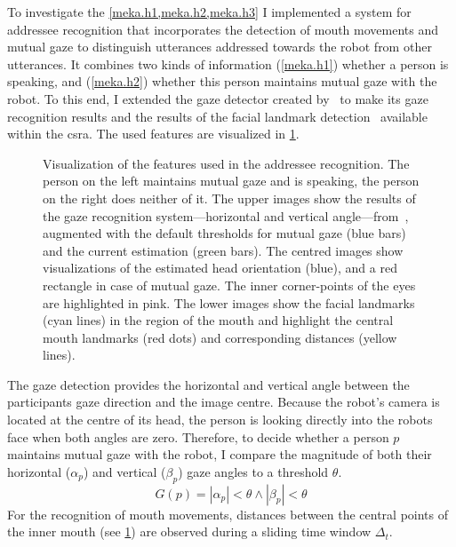 To investigate the \cref{meka.h1,meka.h2,meka.h3} I implemented a system for \gls{addressee} recognition that incorporates the detection of mouth movements and mutual gaze to distinguish utterances addressed towards the \gls{robot} from other utterances.
It combines two kinds of information (\cref{meka.h1}) whether a person is speaking, and (\cref{meka.h2}) whether this person maintains mutual gaze with the \gls{robot}.
To this end, I extended the gaze detector created by~ to make its gaze recognition results and the results of the facial landmark detection~\cite{Sagonas2013} available within the \gls{csra}.
The used features are visualized in \cref{fig:meka-features}.
\begin{figure}[htb]
    \centering
    \def\svgwidth{1.0\textwidth}
    
    \caption[Mutual gaze and mouth movement features.]{\label{fig:meka-features}
    Visualization of the features used in the \gls{addressee} recognition.
    The person on the left maintains mutual gaze and is speaking, the person on the right does neither of it.
    The upper images show the results of the gaze recognition system---horizontal and vertical angle---from~, augmented with the default thresholds for mutual gaze (blue bars) and the current estimation (green bars).
    The centred images show visualizations of the estimated head orientation (blue), and a red rectangle in case of mutual gaze.
    The inner corner-points of the eyes are highlighted in pink.
    The lower images show the facial landmarks (cyan lines) in the region of the mouth and highlight the central mouth landmarks (red dots) and corresponding distances (yellow lines).
    }
\end{figure}
The gaze detection provides the horizontal and vertical angle between the participants gaze direction and the image centre.
Because the \gls{robot}'s camera is located at the centre of its head, the person is looking directly into the \glspl{robot} face when both angles are zero.
Therefore, to decide whether a person \(p\) maintains mutual gaze with the \gls{robot}, I compare the magnitude of both their horizontal (\(\alpha_p\)) and vertical (\(\beta_p\)) gaze angles to a threshold \(\theta\).
\begin{equation}\label{eq:meka.mg}
    G(p) = | \alpha_p | < \theta \land | \beta_p | < \theta
\end{equation}
For the recognition of mouth movements, distances between the central points of the inner mouth (see \cref{fig:meka-features}) are observed during a sliding time window \(\Delta_t\).
